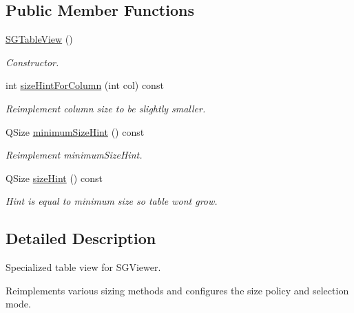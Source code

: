 \subsection*{Public Member Functions}
\begin{DoxyCompactItemize}
\item 
\mbox{\label{classSGTableView_a2e0b0f4185cd89e132ae16ba606fe359}} 
\hyperlink{classSGTableView_a2e0b0f4185cd89e132ae16ba606fe359}{S\+G\+Table\+View} ()
\begin{DoxyCompactList}\small\item\em Constructor. \end{DoxyCompactList}\item 
\mbox{\label{classSGTableView_af1be121b0cde3efdf81007fa76671592}} 
int \hyperlink{classSGTableView_af1be121b0cde3efdf81007fa76671592}{size\+Hint\+For\+Column} (int col) const
\begin{DoxyCompactList}\small\item\em Reimplement column size to be slightly smaller. \end{DoxyCompactList}\item 
Q\+Size \hyperlink{classSGTableView_aa43840054c859a9c6e459f03a63e41a5}{minimum\+Size\+Hint} () const
\begin{DoxyCompactList}\small\item\em Reimplement minimum\+Size\+Hint. \end{DoxyCompactList}\item 
\mbox{\label{classSGTableView_aa90fb3ccaf73c2ef9bdfd37014111521}} 
Q\+Size \hyperlink{classSGTableView_aa90fb3ccaf73c2ef9bdfd37014111521}{size\+Hint} () const
\begin{DoxyCompactList}\small\item\em Hint is equal to minimum size so table wont grow. \end{DoxyCompactList}\end{DoxyCompactItemize}


\subsection{Detailed Description}
Specialized table view for S\+G\+Viewer. 

Reimplements various sizing methods and configures the size policy and selection mode. 

